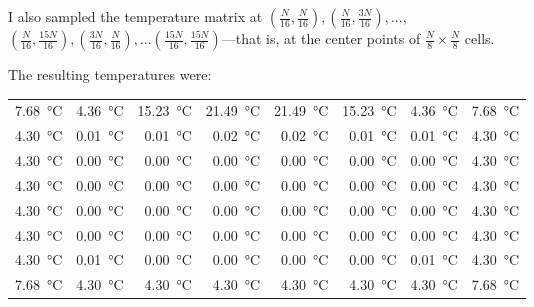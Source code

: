\documentclass[12pt,letterpaper,oneside]{article}
\begin{document}
I also sampled the temperature matrix at $\left(\frac{N}{16}, \frac{N}{16}\right), \left(\frac{N}{16}, \frac{3N}{16}\right), ...,$\\
$ \left(\frac{N}{16}, \frac{15N}{16}\right), \left(\frac{3N}{16}, \frac{N}{16}\right), ... (\frac{15N}{16}, \frac{15N}{16})$---that is, at the center points of $\frac{N}{8}\times\frac{N}{8}$ cells. 

The resulting temperatures were:
\begin{center}
	\small
	\begin{tabular}{r r r r r r r r}
		\SI{7.68}{\celsius} & \SI{4.36}{\celsius} & \SI{15.23}{\celsius} & \SI{21.49}{\celsius} & \SI{21.49}{\celsius} & \SI{15.23}{\celsius} & \SI{4.36}{\celsius} & \SI{7.68}{\celsius} \\
		\SI{4.30}{\celsius} & \SI{0.01}{\celsius} & \SI{0.01}{\celsius} & \SI{0.02}{\celsius} & \SI{0.02}{\celsius} & \SI{0.01}{\celsius} & \SI{0.01}{\celsius} & \SI{4.30}{\celsius}  \\
		\SI{4.30}{\celsius} & \SI{0.00}{\celsius} & \SI{0.00}{\celsius} & \SI{0.00}{\celsius} & \SI{0.00}{\celsius} & \SI{0.00}{\celsius} & \SI{0.00}{\celsius} & \SI{4.30}{\celsius} \\
		\SI{4.30}{\celsius} & \SI{0.00}{\celsius} & \SI{0.00}{\celsius} & \SI{0.00}{\celsius} & \SI{0.00}{\celsius} & \SI{0.00}{\celsius} & \SI{0.00}{\celsius} & \SI{4.30}{\celsius} \\
		\SI{4.30}{\celsius} & \SI{0.00}{\celsius} & \SI{0.00}{\celsius} & \SI{0.00}{\celsius} & \SI{0.00}{\celsius} & \SI{0.00}{\celsius} & \SI{0.00}{\celsius} & \SI{4.30}{\celsius} \\
		\SI{4.30}{\celsius} & \SI{0.00}{\celsius} & \SI{0.00}{\celsius} & \SI{0.00}{\celsius} & \SI{0.00}{\celsius} & \SI{0.00}{\celsius} & \SI{0.00}{\celsius} & \SI{4.30}{\celsius} \\
		\SI{4.30}{\celsius} & \SI{0.01}{\celsius} & \SI{0.00}{\celsius} & \SI{0.00}{\celsius} & \SI{0.00}{\celsius} & \SI{0.00}{\celsius} & \SI{0.01}{\celsius} & \SI{4.30}{\celsius} \\
		\SI{7.68}{\celsius} & \SI{4.30}{\celsius} & \SI{4.30}{\celsius} & \SI{4.30}{\celsius} & \SI{4.30}{\celsius} & \SI{4.30}{\celsius} & \SI{4.30}{\celsius} & \SI{7.68}{\celsius}
	\end{tabular}
	\normalsize
\end{center}
\end{document}
